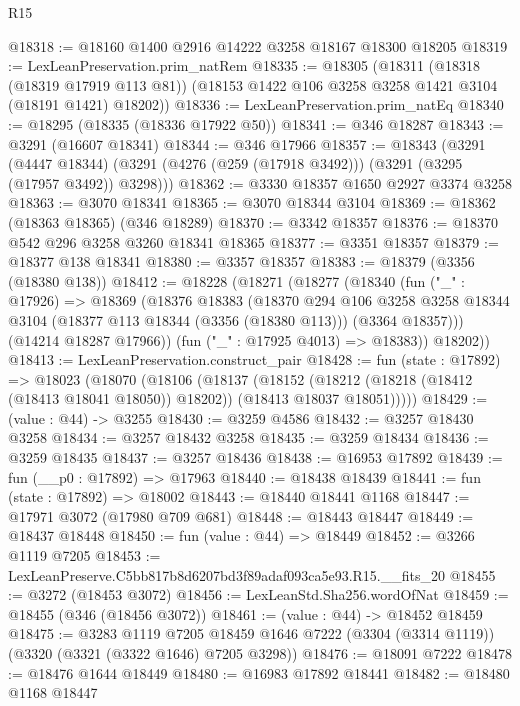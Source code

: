 \begin{lexlean}{R15}
\begin{coremodule}
@18318 := @18160 @1400 @2916 @14222 @3258 @18167 @18300 @18205
@18319 := LexLeanPreservation.prim_natRem
@18335 := @18305
    (@18311
      (@18318 (@18319 @17919 @113 @81))
      (@18153 @1422 @106 @3258 @3258 @1421 @3104 (@18191 @1421) @18202))
@18336 := LexLeanPreservation.prim_natEq
@18340 := @18295 (@18335 (@18336 @17922 @50))
@18341 := @346 @18287
@18343 := @3291 (@16607 @18341)
@18344 := @346 @17966
@18357 := @18343
    (@3291
      (@4447 @18344)
      (@3291 (@4276 (@259 (@17918 @3492))) (@3291 (@3295 (@17957 @3492)) @3298)))
@18362 := @3330 @18357 @1650 @2927 @3374 @3258
@18363 := @3070 @18341
@18365 := @3070 @18344 @3104
@18369 := @18362 (@18363 @18365) (@346 @18289)
@18370 := @3342 @18357
@18376 := @18370 @542 @296 @3258 @3260 @18341 @18365
@18377 := @3351 @18357
@18379 := @18377 @138 @18341
@18380 := @3357 @18357
@18383 := @18379 (@3356 (@18380 @138))
@18412 := @18228
    (@18271
      (@18277
        (@18340
          (fun ("_" : @17926) =>
          @18369
            (@18376
              @18383
              (@18370
                @294
                @106
                @3258
                @3258
                @18344
                @3104
                (@18377 @113 @18344 (@3356 (@18380 @113)))
                (@3364 @18357)))
            (@14214 @18287 @17966))
          (fun ("_" : @17925 @4013) => @18383))
        @18202))
@18413 := LexLeanPreservation.construct_pair
@18428 := fun (state : @17892) =>
  @18023
    (@18070
      (@18106
        (@18137
          (@18152
            (@18212 (@18218 (@18412 (@18413 @18041 @18050)) @18202))
            (@18413 @18037 @18051)))))
@18429 := (value : @44) -> @3255
@18430 := @3259 @4586
@18432 := @3257 @18430 @3258
@18434 := @3257 @18432 @3258
@18435 := @3259 @18434
@18436 := @3259 @18435
@18437 := @3257 @18436
@18438 := @16953 @17892
@18439 := fun (__p0 : @17892) => @17963
@18440 := @18438 @18439
@18441 := fun (state : @17892) => @18002
@18443 := @18440 @18441 @1168
@18447 := @17971 @3072 (@17980 @709 @681)
@18448 := @18443 @18447
@18449 := @18437 @18448
@18450 := fun (value : @44) => @18449
@18452 := @3266 @1119 @7205
@18453 := LexLeanPreserve.C5bb817b8d6207bd3f89adaf093ca5e93.R15.__fits_20
@18455 := @3272 (@18453 @3072)
@18456 := LexLeanStd.Sha256.wordOfNat
@18459 := @18455 (@346 (@18456 @3072))
@18461 := (value : @44) -> @18452 @18459
@18475 := @3283
    @1119
    @7205
    @18459
    @1646
    @7222
    (@3304 (@3314 @1119))
    (@3320 (@3321 (@3322 @1646) @7205 @3298))
@18476 := @18091 @7222
@18478 := @18476 @1644 @18449
@18480 := @16983 @17892 @18441
@18482 := @18480 @1168 @18447

\end{coremodule}
\end{lexlean}
